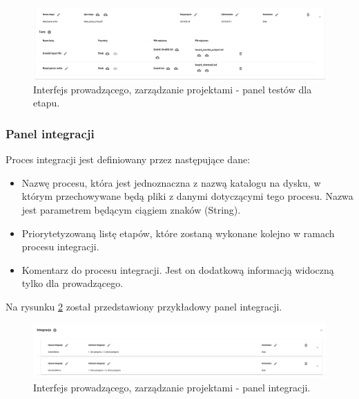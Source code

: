 \begin{figure}[h]
    \centering
    \includegraphics[width = 15cm]{chapter04/lecturer_stages_tests.png}
    \caption{Interfejs prowadzącego, zarządzanie projektami - panel testów dla etapu.}
    \label{fig:lecturer_stages_tests}
\end{figure}

\subsubsection{Panel integracji}

Proces integracji jest definiowany przez następujące dane:
\begin {itemize}
    \item Nazwę procesu, która jest jednoznaczna z nazwą katalogu na dysku, w którym przechowywane będą pliki z danymi dotyczącymi tego procesu.
    Nazwa jest parametrem będącym ciągiem znaków (String).
    \item Priorytetyzowaną listę etapów, które zostaną wykonane kolejno w ramach procesu integracji.
    \item Komentarz do procesu integracji.
    Jest on dodatkową informacją widoczną tylko dla prowadzącego.
\end {itemize}

Na rysunku \ref{fig:lecturer_integrations} został przedstawiony przykładowy panel integracji.

\begin{figure}[h]
    \centering
    \includegraphics[width = 15cm]{chapter04/lecturer_integrations.png}
    \caption{Interfejs prowadzącego, zarządzanie projektami - panel integracji.}
    \label{fig:lecturer_integrations}
\end{figure}

